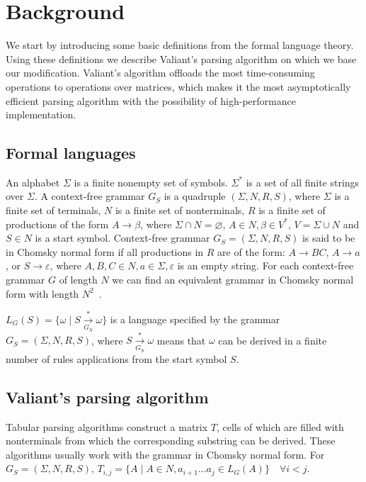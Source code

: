 \section{Background}

We start by introducing some basic definitions from the formal language theory. Using these definitions we describe Valiant's parsing algorithm on which we base our modification. Valiant's algorithm offloads the most time-consuming operations to operations over matrices, which makes it the most asymptotically efficient parsing algorithm with the possibility of high-performance implementation.

\subsection{Formal languages}

An alphabet $\Sigma$ is a finite nonempty set of symbols.
$\Sigma^{*}$ is a set of all finite strings over $\Sigma$.
A context-free grammar $G_S$ is a quadruple $(\Sigma, N, R, S)$, where $\Sigma$ is a finite set of terminals, $N$ is a finite set of nonterminals, $R$ is a finite set of productions of the form $A \rightarrow \beta$, where $\Sigma \cap N = \varnothing$, $A \in N, \beta \in V^{*}$, $V = \Sigma \cup N$ and $S \in N$ is a start symbol.
Context-free grammar $G_S = (\Sigma, N, R, S)$ is said to be in Chomsky normal form if all productions in $R$ are of the form: $A \rightarrow BC$, $A \rightarrow a$, or $S \rightarrow \varepsilon$, where $A, B, C \in N, a \in \Sigma, \varepsilon$ is an empty string.
For each context-free grammar $G$ of length $N$ we can find an equivalent grammar in Chomsky normal form with length $N^2$~\cite{hopcroft2008introduction}.

$L_{G}(S) = \{ \omega \mid S\xrightarrow[G_S]{*} \omega\}$ is a language specified by the grammar $G_{S} = (\Sigma, N, R, S)$, where $S \xrightarrow[G_S]{*} \omega$ means that $\omega$ can be derived in a finite number of rules applications from the start symbol $S$.

\subsection{Valiant's parsing algorithm}

Tabular parsing algorithms construct a matrix $T$, cells of which are filled with nonterminals from which the corresponding substring can be derived. 
These algorithms usually work with the grammar in Chomsky normal form.
For $G_S=(\Sigma, N, R, S)$, $T_{i, j} =  \{ A \mid A \in N, a_{i + 1} \dots a_{j} \in L_{G}(A)\} \quad \forall i < j$.

